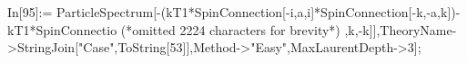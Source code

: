 In[95]:= ParticleSpectrum[-(kT1*SpinConnection[-i,a,i]*SpinConnection[-k,-a,k])-kT1*SpinConnectio (*omitted 2224 characters for brevity*) ,k,-k]],TheoryName->StringJoin["Case",ToString[53]],Method->"Easy",MaxLaurentDepth->3];